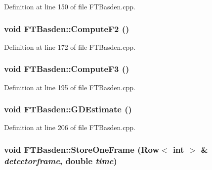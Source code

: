 Definition at line 150 of file FTBasden.cpp.

\hypertarget{classFTBasden_a1a78fe9de40c29a7379ff938e5f87cb3}{
\subsubsection[{ComputeF2}]{\setlength{\rightskip}{0pt plus 5cm}void FTBasden::ComputeF2 ()}}
\label{classFTBasden_a1a78fe9de40c29a7379ff938e5f87cb3}


Definition at line 172 of file FTBasden.cpp.

\hypertarget{classFTBasden_afb9ff4ea4467ec2245c72dbda5dd55a1}{
\subsubsection[{ComputeF3}]{\setlength{\rightskip}{0pt plus 5cm}void FTBasden::ComputeF3 ()}}
\label{classFTBasden_afb9ff4ea4467ec2245c72dbda5dd55a1}


Definition at line 195 of file FTBasden.cpp.

\hypertarget{classFTBasden_acd78f51a4e9289f0baa700911a8d57e8}{
\subsubsection[{GDEstimate}]{\setlength{\rightskip}{0pt plus 5cm}void FTBasden::GDEstimate ()}}
\label{classFTBasden_acd78f51a4e9289f0baa700911a8d57e8}


Definition at line 206 of file FTBasden.cpp.

\hypertarget{classFTBasden_a76fe6fade8b81a074ea5e1724dbe4d6c}{
\subsubsection[{StoreOneFrame}]{\setlength{\rightskip}{0pt plus 5cm}void FTBasden::StoreOneFrame ({\bf Row}$<$ int $>$ \& {\em detectorframe}, \/  double {\em time})}}
\label{classFTBasden_a76fe6fade8b81a074ea5e1724dbe4d6c}


